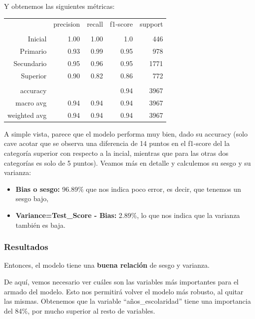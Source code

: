 \documentclass[a4paper]{article}
\begin{document}
            Y obtenemos las siguientes métricas:

            \begin{table}[H]
                \centering
                \begin{tabular}{rrrrr}
                    ~ & precision & recall & f1-score & support \\ 
                    & & & & \\
                    Inicial    & 1.00& 1.00 & 1.0 & 446 \\ 
                    Primario   & 0.93 & 0.99 & 0.95 & 978 \\ 
                    Secundario & 0.95 & 0.96 & 0.95 & 1771 \\ 
                    Superior   & 0.90 & 0.82 & 0.86 & 772 \\ 
                    & & & & \\
                    accuracy & & & 0.94 & 3967 \\ 
                    macro avg & 0.94 & 0.94 & 0.94 & 3967 \\ 
                    weighted avg & 0.94 & 0.94 & 0.94 & 3967 \\ 
                \end{tabular}
            \end{table}

            A simple vista, parece que el modelo performa muy bien, dado su accuracy (solo cave acotar que se observa una diferencia de 14 puntos en el f1-score del la categoría superior con respecto a la incial, mientras que para las otras dos categorías es solo de 5 puntos). Veamos más en detalle y calculemos su sesgo y su varianza:
            \begin{itemize}
                \item \textbf{Bias o sesgo:} 96.89\% que nos indica poco error, es decir, que tenemos un sesgo bajo,
                \item \textbf{Variance=Test\_Score - Bias:} 2.89\%, lo que nos indica que la varianza también es baja.
            \end{itemize}


            \subsubsection*{Resultados}

            Entonces, el modelo tiene una \textbf{buena relación} de sesgo y varianza.

            De aquí, vemos necesario ver cuáles son las variables más importantes para el armado del modelo. Esto nos permitirá volver el modelo más robusto, al quitar las mismas. Obtenemos que la variable ``años\_escolaridad'' tiene una importancia del 84\%, por mucho superior al resto de variables.
\end{document}

